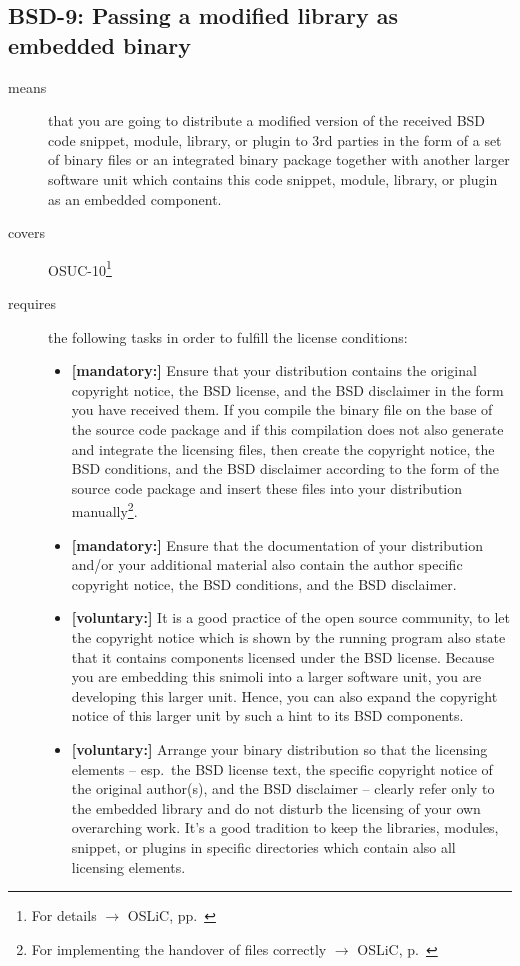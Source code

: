 \subsection{BSD-9: Passing a modified library as embedded binary}

\begin{description}
\item[means] that you are going to distribute a modified version of the received
BSD code snippet, module, library, or plugin to 3rd parties in the form of a set of
binary files or an integrated binary package together with another larger
software unit which contains this code snippet, module, library, or plugin as
an embedded component.
\item[covers] OSUC-10\footnote{For details $\rightarrow$ OSLiC, pp.\ \pageref{OSUC-10-DEF}}
\item[requires] the following tasks in order to fulfill the license conditions:
\begin{itemize}
  \item  \textbf{[mandatory:]} Ensure that your distribution contains the
  original copyright notice, the BSD license, and the BSD disclaimer in the form
  you have received them. If you compile the binary file on the base of the
  source code package and if this compilation does not also generate and
  integrate the licensing files, then create the copyright notice, the BSD
  conditions, and the BSD disclaimer according to the form of the source code
  package and insert these files into your distribution manually\footnote{For
  implementing the handover of files correctly $\rightarrow$ OSLiC, p.\
  \pageref{DistributingFilesHint}}.
  \item  \textbf{[mandatory:]} Ensure that the documentation of your
  distribution and/or your additional material also contain the author specific
  copyright notice, the BSD conditions, and the BSD disclaimer.
 \item \textbf{[voluntary:]} It is a good practice of the open source
  community, to let the copyright notice which is shown by the running program
  also state that it contains components licensed under the BSD license. Because
  you are embedding this snimoli into a larger software unit, you are
  developing this larger unit. Hence, you can also expand the copyright notice
  of this larger unit by such a hint to its BSD components.
  
  \item \textbf{[voluntary:]} Arrange your binary distribution so that the
  licensing elements -- esp.\ the BSD license text, the specific copyright
  notice of the original author(s), and the BSD disclaimer -- clearly refer
  only to the embedded library and do not disturb the licensing of your own
  overarching work. It's a good tradition to keep the libraries, modules,
  snippet, or plugins in specific directories which contain also all licensing
  elements.
\end{itemize}


\end{description}
